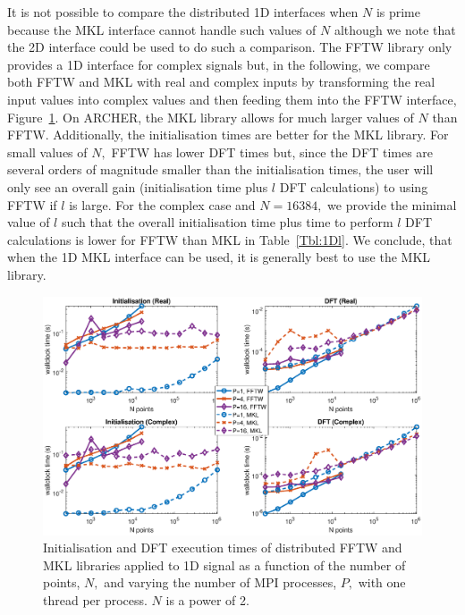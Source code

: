 \documentclass[a4paper]{article}
\begin{document}
It is not possible to compare the distributed 1D interfaces when $N$
is prime because the MKL interface cannot handle such values of $N$
although we note that the 2D interface could be used to do such a
comparison. The FFTW library only provides a 1D interface for complex
signals but, in the following, we compare both FFTW and MKL with real
and complex inputs by transforming the real input values into complex
values and then feeding them into the FFTW interface,
Figure~\ref{1DDistFFTWMKL2}. On ARCHER, the MKL library allows for
much larger values of $N$ than FFTW. Additionally, the initialisation
times are better for the MKL library. For small values of $N,$ FFTW
has lower DFT times but, since the DFT times are several orders of
magnitude smaller than the initialisation times, the user will only
see an overall gain (initialisation time plus $l$ DFT calculations) to
using FFTW if $l$ is large. For the complex case and $N=16384,$ we
provide the minimal value of $l$ such that the overall initialisation
time plus time to perform $l$ DFT calculations is lower for FFTW than
MKL in Table~\ref{Tbl:1Dl}. We conclude, that when the 1D MKL
interface can be used, it is generally best to use the MKL library.

\begin{figure}[htb]
    \centering
    \includegraphics[width=0.9\linewidth]{../results/fftw_mkl_2_1d_mpi.eps}
  \caption{Initialisation and DFT execution times of distributed FFTW and MKL libraries applied to 1D signal as a function of the
    number of points, $N,$ and varying the number of MPI processes, $P,$ with one thread per process. $N$ is a power of 2.}
  \label{1DDistFFTWMKL2}
\end{figure}
\end{document}
